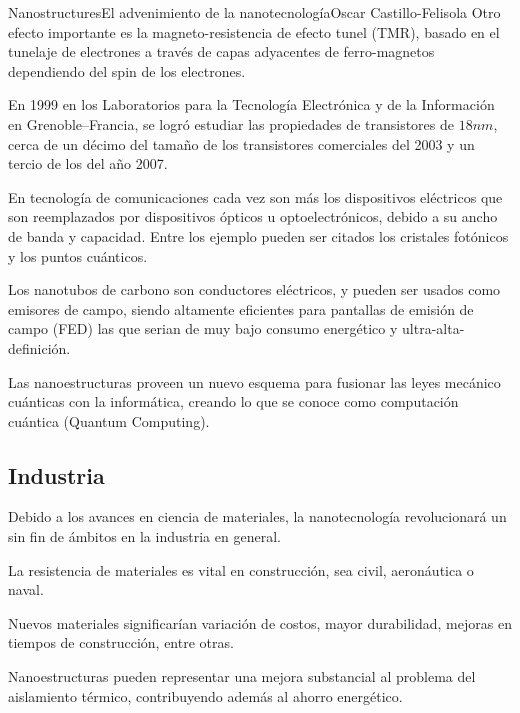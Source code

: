 \begin{article}{Nanostructures}{El advenimiento de la nanotecnolog\'ia}{Oscar Castillo-Felisola}
Otro efecto importante es la magneto-resistencia de efecto tunel (TMR), basado en el tunelaje de electrones a trav\'es de capas adyacentes  de ferro-magnetos dependiendo del spin de los electrones.

En 1999 en los Laboratorios para la Tecnolog\'ia Electr\'onica y de la Informaci\'on en Grenoble--Francia, se logr\'o estudiar las propiedades de transistores de $18 nm$, cerca de un d\'ecimo del tama\~no de los transistores comerciales del 2003 y un tercio de los del a\~no 2007.

En tecnolog\'ia de comunicaciones cada vez son m\'as los dispositivos el\'ectricos que son reemplazados por dispositivos \'opticos u optoelectr\'onicos, debido a su ancho de banda y capacidad. Entre los ejemplo pueden ser citados los cristales fot\'onicos y los puntos cu\'anticos.

Los nanotubos de carbono son conductores el\'ectricos, y pueden ser usados como emisores de campo,%
 siendo altamente eficientes para pantallas de emisi\'on de campo (FED) las que serian de muy bajo consumo energ\'etico y ultra-alta-definici\'on.

Las nanoestructuras proveen un nuevo esquema para fusionar las leyes mec\'anico cu\'anticas con la inform\'atica, creando lo que se conoce como computaci\'on cu\'antica (Quantum Computing).


\subsection{Industria}

Debido a los avances en ciencia de materiales, la nanotecnolog\'ia revolucionar\'a un sin fin de \'ambitos en la industria en general.

La resistencia de materiales es vital en construcci\'on, sea civil, aeron\'autica o naval. 

Nuevos materiales significar\'ian variaci\'on de costos, mayor durabilidad, mejoras en tiempos de construcci\'on, entre otras.

Nanoestructuras pueden representar una mejora substancial al problema del aislamiento t\'ermico, contribuyendo adem\'as al ahorro energ\'etico.


\end{article}
